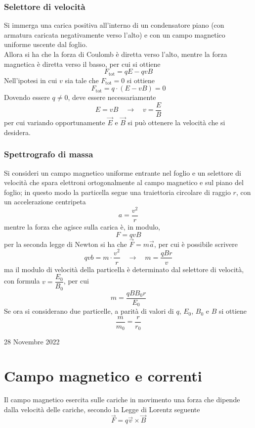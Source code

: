 \documentclass[a4paper]{extarticle}
\begin{document}
\subsubsection{Selettore di velocità}
Si immerga una carica positiva all'interno di un condensatore piano (con armatura caricata negativamente verso l'alto) e con un campo magnetico uniforme uscente dal foglio.\\
Allora si ha che la forza di Coulomb è diretta verso l'alto, mentre la forza magnetica è diretta verso il basso, per cui si ottiene
\[F_\text{tot} = qE - qvB\]
Nell'ipotesi in cui $v$ sia tale che $F_\text{tot}=0$ si ottiene
\[F_\text{tot} = q \cdot (E - vB) = 0\]
Dovendo essere $q \neq 0$, deve essere necessariamente
\[E = vB \hspace{1em} \rightarrow \hspace{1em} v = \dfrac{E}{B}\]
per cui variando opportunamente $\vec E$ e $\vec B$ si può ottenere la velocità che si desidera.

\vspace{1em}
\noindent
\subsubsection{Spettrografo di massa}
Si consideri un campo magnetico uniforme entrante nel foglio e un selettore di velocità che spara elettroni ortogonalmente al campo magnetico e sul piano del foglio; in questo modo la particella segue una traiettoria circolare di raggio $r$, con un accelerazione centripeta
\[a=\dfrac{v^2}{r}\]
mentre la forza che agisce sulla carica è, in modulo,
\[F=qvB\]
per la seconda legge di Newton si ha che $\vec F = m \vec a$, per cui è possibile scrivere
\[qvb = m \cdot \dfrac{v^2}{r} \hspace{1em} \rightarrow \hspace{1em} m=\dfrac{q B r}{v}\]
ma il modulo di velocità della particella è determinato dal selettore di velocità, con formula $v=\dfrac{E_0}{B_0}$, per cui
\[m = \dfrac{q B B_0 r}{E_0}\]
Se ora si considerano due particelle, a parità di valori di $q$, $E_0$, $B_0$ e $B$ si ottiene
\[\dfrac{m}{m_0} = \dfrac{r}{r_0}\]

\newpage
\noindent
\begin{center}
  28 Novembre 2022
\end{center}
\section{Campo magnetico e correnti}
Il campo magnetico esercita sulle cariche in movimento una forza che dipende dalla velocità delle cariche, secondo la Legge di Lorentz seguente
\[\vec F = q \vec v \times \vec B\]
\end{document}
